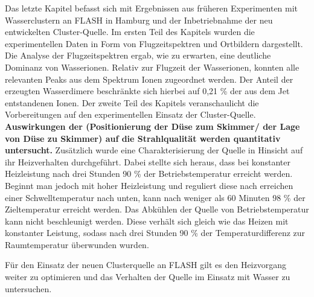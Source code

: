Das letzte Kapitel befasst sich mit Ergebnissen aus früheren Experimenten mit Wasserclustern an FLASH in Hamburg und der Inbetriebnahme der neu entwickelten Cluster-Quelle.
Im ersten Teil des Kapitels wurden die experimentellen Daten in Form von Flugzeitspektren und Ortbildern dargestellt. Die Analyse der Flugzeitspektren ergab, wie zu erwarten, eine deutliche Dominanz von Wasserionen. Relativ zur Flugzeit der Wasserionen, konnten alle relevanten Peaks aus dem Spektrum Ionen zugeordnet werden. Der Anteil der erzeugten Wasserdimere beschränkte sich hierbei auf 0,21 \% der aus dem Jet entstandenen Ionen.
Der zweite Teil des Kapitels veranschaulicht die Vorbereitungen auf den experimentellen Einsatz der Cluster-Quelle. \textbf{Auswirkungen der (Positionierung der Düse zum Skimmer/ der Lage von Düse zu Skimmer) auf die Strahlqualität werden quantitativ untersucht.} Zusätzlich wurde eine Charakterisierung der Quelle in Hinsicht auf ihr Heizverhalten durchgeführt. Dabei stellte sich heraus, dass bei konstanter Heizleistung nach drei Stunden 90 \% der Betriebstemperatur erreicht werden. Beginnt man jedoch mit hoher Heizleistung und reguliert diese nach erreichen einer Schwelltemperatur nach unten, kann nach weniger als 60 Minuten 98 \% der Zieltemperatur erreicht werden. Das Abkühlen der Quelle von Betriebstemperatur kann nicht beschleunigt werden. Diese verhält sich gleich wie das Heizen mit konstanter Leistung, sodass nach drei Stunden 90 \% der Temperaturdifferenz zur Raumtemperatur überwunden wurden. 

Für den Einsatz der neuen Clusterquelle an FLASH gilt es den Heizvorgang weiter zu optimieren und das Verhalten der Quelle im Einsatz mit Wasser zu untersuchen.

